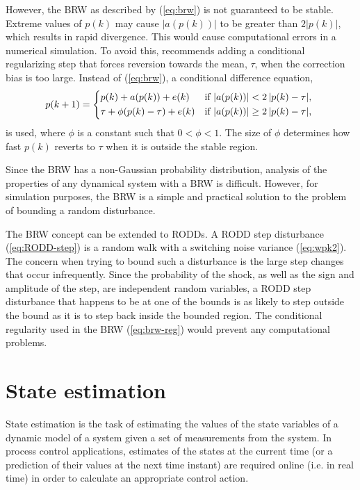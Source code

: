 However, the \gls{BRW} as described by (\ref{eq:brw}) is not guaranteed to be stable. Extreme values of $p(k)$ may cause $|a(p(k))|$ to be greater than $2|p(k)|$, which results in rapid divergence. This would cause computational errors in a numerical simulation. To avoid this, \cite{nicolau_stationary_2002} recommends adding a conditional regularizing step that forces reversion towards the mean, $\tau$, when the correction bias is too large. Instead of (\ref{eq:brw}), a conditional difference equation,
\begin{equation} \label{eq:brw-reg}
	p(k+1) = \begin{cases*}
		p(k) + a(p(k)) + e(k) & if $\left|a(p(k)) \right| < 2\left| p(k) - \tau \right|$, \\
		\tau + \phi(p(k) - \tau) + e(k) & if $\left|a(p(k)) \right| \geq 2\left| p(k) - \tau \right|$,
	\end{cases*}
\end{equation}
is used, where $\phi$ is a constant such that $0<\phi<1$. The size of $\phi$ determines how fast $p(k)$ reverts to $\tau$ when it is outside the stable region.

Since the \gls{BRW} has a non-Gaussian probability distribution, analysis of the properties of any dynamical system with a \gls{BRW} is difficult. However, for simulation purposes, the \gls{BRW} is a simple and practical solution to the problem of bounding a random disturbance.

The \gls{BRW} concept can be extended to \gls{RODD}s. A \gls{RODD} step disturbance (\ref{eq:RODD-step}) is a random walk with a switching noise variance (\ref{eq:wpk2}). The concern when trying to bound such a disturbance is the large step changes that occur infrequently. Since the probability of the shock, as well as the sign and amplitude of the step, are independent random variables, a \gls{RODD} step disturbance that happens to be at one of the bounds is as likely to step outside the bound as it is to step back inside the bounded region. The conditional regularity used in the \gls{BRW} (\ref{eq:brw-reg}) would prevent any computational problems. 


\section{State estimation} \label{sec:estimation}

State estimation is the task of estimating the values of the state variables of a dynamic model of a system given a set of measurements from the system. In process control applications, estimates of the states at the current time (or a prediction of their values at the next time instant) are required online (i.e. in real time) in order to calculate an appropriate control action.

